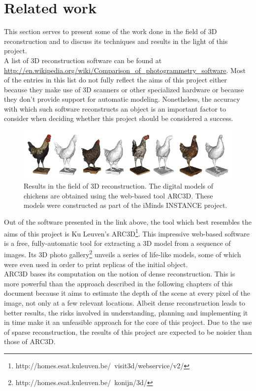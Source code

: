 \documentclass[12pt,a4paper,twoside,openright]{report}
\begin{document}
\section{Related work}
This section serves to present some of the work done in the field of 3D reconstruction and to discuss its techniques and results in the light of this project.\\
\linebreak
A list of 3D reconstruction software can be found at \url{http://en.wikipedia.org/wiki/Comparison_of_photogrammetry_software}. Most of the entries in this list do not fully reflect the aims of this project either because they make use of 3D scanners or other specialized hardware or because they don't provide support for automatic modeling. Nonetheless, the accuracy with which such software reconstructs an object is an important factor to consider when deciding whether this project should be considered a success.\\
\linebreak
\begin{figure}
\centerline{\includegraphics[scale=0.8]{figs/CHICKENS.jpg}}
\caption{Results in the field of 3D reconstruction. The digital models of chickens are obtained using the web-based tool ARC3D. These models were constructed as part of the iMinds INSTANCE project.}
\end{figure}
Out of the software presented in the link above, the tool which best resembles the aims of this project is Ku Leuven's ARC3D\footnote{http://homes.esat.kuleuven.be/~visit3d/webservice/v2/}. This impressive web-based software is a free, fully-automatic tool for extracting a 3D model from a sequence of images. Its 3D photo gallery\footnote{http://homes.esat.kuleuven.be/~konijn/3d/} unveils a series of life-like models, some of which were even used in order to print replicas of the initial object.\\
\linebreak
ARC3D bases its computation on the notion of dense reconstruction\cite{tingdahl_lncs_11}. This is more powerful than the approach described in the following chapters of this document because it aims to estimate the depth of the scene at every pixel of the image, not only at a few relevant locations. Albeit dense reconstruction leads to better results, the risks involved in understanding, planning and implementing it in time make it an unfeasible approach for the core of this project. Due to the use of sparse reconstruction, the results of this project are expected to be noisier than those of ARC3D. 
\end{document}
